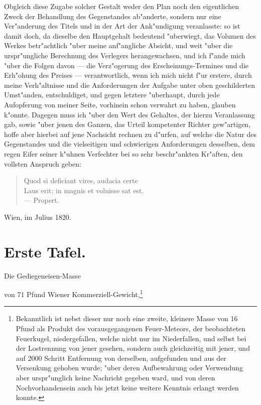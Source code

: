 \documentclass[a4paper, 11pt, oneside, german]{article}
\begin{document}
Obgleich diese Zugabe solcher Gestalt weder den Plan noch den eigentlichen Zweck der Behandlung des Gegenstandes ab"anderte, sondern nur eine Ver"anderung des Titels und in der Art der Ank"undigung veranlasste: so ist damit doch, da dieselbe den Hauptgehalt bedeutend "uberwiegt, das Volumen des Werkes betr"achtlich "uber meine anf"angliche Absicht, und weit "uber die urspr"ungliche Berechnung des Verlegers herangewachsen, und ich f"ande mich "uber die Folgen davon --- die Verz"ogerung des Erscheinungs-Termines und die Erh"ohung des Preises --- verantwortlich, wenn ich mich nicht f"ur erstere, durch meine Verh"altnisse und die Anforderungen der Aufgabe unter oben geschilderten Umst"anden, entschuldiget, und gegen letztere "uberhaupt, durch jede Aufopferung von meiner Seite, vorhinein schon verwahrt zu haben, glauben k"onnte. Dagegen muss ich "uber den Wert des Gehaltes, der hierzu Veranlassung gab, sowie "uber jenen des Ganzen, das Urteil kompetenter Richter gew"artigen, hoffe aber hierbei auf jene Nachsicht rechnen zu d"urfen, auf welche die Natur des Gegenstandes und die vielseitigen und schwierigen Anforderungen desselben, dem regen Eifer seiner k"uhnen Verfechter bei so sehr beschr"ankten Kr"aften, den vollsten Anspruch geben:

\begin{quote}
Quod si deficiant vires, audacia certe\\
Laus erit; in magnis et voluisse sat est.\\
--- Propert.
\end{quote}

Wien, im Julius 1820.
\clearpage
\section{Erste Tafel.}
\begin{center}
Die Gediegeneisen-Masse

von 71 Pfund Wiener Kommerziell-Gewicht,\footnote{Bekanntlich ist nebst dieser nur noch eine zweite, kleinere Masse von 16 Pfund als Produkt des vorausgegangenen Feuer-Meteors, der beobachteten Feuerkugel, niedergefallen, welche nicht nur im Niederfallen, und selbst bei der Lostrennung von jener gesehen, sondern auch gleichzeitig mit jener, und auf 2000 Schritt Entfernung von derselben, aufgefunden und aus der Versenkung gehoben wurde; "uber deren Aufbewahrung oder Verwendung aber urspr"unglich keine Nachricht gegeben ward, und von deren Nochvorhandensein auch bis jetzt keine weitere Kenntnis erlangt werden konnte.}
\end{center}
\end{document}
